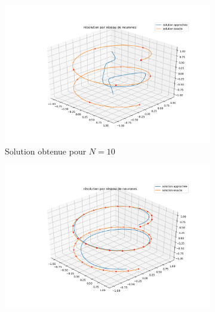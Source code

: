 \documentclass[12pt]{report}
\begin{document}
\begin{figure}
    \centering
    \begin{subfigure}[b]{0.4\textwidth}
        \centering
        \includegraphics[width=1\textwidth, height=0.9\textwidth]{direct_training_N=10.png}
        \caption{Solution obtenue pour $N=10$}
    \end{subfigure}
    \hfill
    \begin{subfigure}[b]{0.4\textwidth}
        \centering
        \includegraphics[width=1\textwidth, height=0.9\textwidth]{direct_training_N=40.png}

\end{subfigure}
\end{figure}
\end{document}
